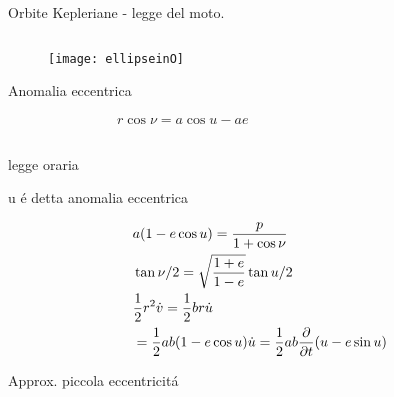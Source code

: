 \begin{frame}{Orbite Kepleriane - legge del moto.}

\begin{columns}

\begin{column}{0.25\textwidth}

\begin{figure}[!ht]

\texttt{[image: ellipseinO]}

\end{figure}

\begin{block}{Anomalia eccentrica}

\begin{align}
r\cos{\nu}=a\cos{u}-ae
\end{align}

\end{block}


\end{column}

\begin{column}{0.4\textwidth}

\end{column}

\end{columns}

\end{frame}

\begin{wordonframe}{legge oraria}

u \'e detta anomalia eccentrica

\begin{align*}
&a(1-e\cos{u})=\frac{p}{1+\cos{\nu}}\\
&\operatorname{tan}{\nu/2}=\sqrt{\frac{1+e}{1-e}}\operatorname{tan}{u/2}\\
&\frac{1}{2}r^2\dot{v}=\frac{1}{2}br\dot{u}\\
&=\frac{1}{2}ab(1-e\cos{u})\dot{u}=\frac{1}{2}ab\frac{\partial}{\partial t}(u-e\sin{u})
\end{align*}

\end{wordonframe}

\begin{frame}{Approx. piccola eccentricit\'a}

\end{frame}

